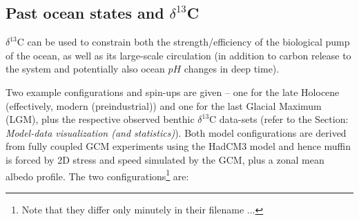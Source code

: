 \documentclass[11pt,fleqn]{book} %
\begin{document}

\subsection{Past ocean states and $\delta^{13}$C}

$\delta^{13}$C can be used to constrain both the strength/efficiency of the biological pump of the ocean, as well as its large-scale circulation (in addition to carbon release to the system and potentially also ocean \(pH\) changes in deep time).

Two example configurations and spin-ups are given -- one for the late Holocene (effectively, modern (preindustrial)) and one for the last Glacial Maximum (LGM), plus the respective observed benthic $\delta^{13}$C data-sets (refer to the Section: \textit{Model-data visualization (and statistics)}). Both model configurations are derived from fully coupled GCM experiments using the HadCM3 model and hence muffin is forced by 2D stress and speed simulated by the GCM, plus a zonal mean albedo profile. The two configurations\footnote{Note that they differ only minutely in their filename ...} are:
\end{document}
